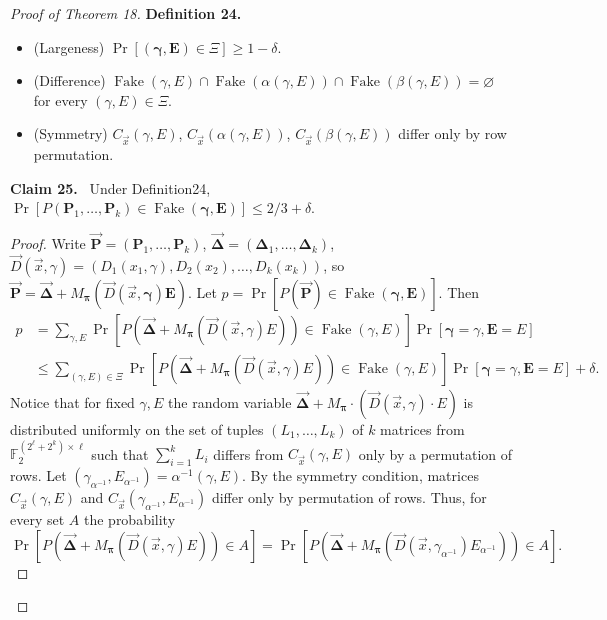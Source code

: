 \documentclass[10pt,a4paper]{article}
\newenvironment{authorclaim}[1]{\par\medskip\noindent\textbf{#1.}\ \ignorespaces}{\par\medskip}
\begin{document}
\begin{proof}[Proof of Theorem 18]
\begin{authorclaim}{Definition 24}
\begin{itemize}
\item (Largeness) $\Pr[(\boldsymbol\gamma,\mathbf E)\in\Xi]\ge1-\delta$.
\item (Difference) $\operatorname{Fake}(\gamma,E)\cap\operatorname{Fake}(\alpha(\gamma,E))\cap\operatorname{Fake}(\beta(\gamma,E))=\varnothing$ for every $(\gamma,E)\in\Xi$.
\item (Symmetry) $C_{\vec x}(\gamma,E)$, $C_{\vec x}(\alpha(\gamma,E))$, $C_{\vec x}(\beta(\gamma,E))$ differ only by row permutation.
\end{itemize}
\end{authorclaim}
\begin{authorclaim}{Claim 25}
Under Definition24, $\Pr[P(\mathbf P_1,\ldots,\mathbf P_k)\in\operatorname{Fake}(\boldsymbol\gamma,\mathbf E)]\le2/3+\delta$.
\end{authorclaim}
\begin{proof}
Write $\boldsymbol{\vec P}=(\mathbf P_1,\ldots,\mathbf P_k)$, $\boldsymbol{\vec\Delta}=(\boldsymbol\Delta_1,\ldots,\boldsymbol\Delta_k)$, $\vec D(\vec x,\gamma)=(D_1(x_1,\gamma),D_2(x_2),\ldots,D_k(x_k))$, so $\boldsymbol{\vec P}=\boldsymbol{\vec\Delta}+M_{\boldsymbol\pi}(\vec D(\vec x,\boldsymbol\gamma)\mathbf E)$.
Let $p=\Pr[P(\boldsymbol{\vec P})\in\operatorname{Fake}(\boldsymbol\gamma,\mathbf E)]$. Then
\begin{align*}
p&=\sum_{\gamma,E}\Pr[P(\boldsymbol{\vec\Delta}+M_{\boldsymbol\pi}(\vec D(\vec x,\gamma)E))\in\operatorname{Fake}(\gamma,E)]\Pr[\boldsymbol\gamma=\gamma,\mathbf E=E]\\
&\le\sum_{(\gamma,E)\in\Xi}\Pr[P(\boldsymbol{\vec\Delta}+M_{\boldsymbol\pi}(\vec D(\vec x,\gamma)E))\in\operatorname{Fake}(\gamma,E)]\Pr[\boldsymbol\gamma=\gamma,\mathbf E=E]+\delta .
\end{align*}
Notice that for fixed $\gamma,E$ the random variable $\boldsymbol{\vec\Delta}+M_{\boldsymbol\pi}\cdot(\vec D(\vec x,\gamma)\cdot E)$ is distributed uniformly on the set of tuples $(L_1,\ldots,L_k)$ of $k$ matrices from $\mathbb F_2^{(2^\ell+2^k)\times\ell}$ such that $\sum_{i=1}^kL_i$ differs from $C_{\vec x}(\gamma,E)$ only by a permutation of rows. Let $(\gamma_{\alpha^{-1}},E_{\alpha^{-1}})=\alpha^{-1}(\gamma,E)$. By the symmetry condition, matrices $C_{\vec x}(\gamma,E)$ and $C_{\vec x}(\gamma_{\alpha^{-1}},E_{\alpha^{-1}})$ differ only by permutation of rows. Thus, for every set $A$ the probability
\[
\Pr[P(\boldsymbol{\vec\Delta}+M_{\boldsymbol\pi}(\vec D(\vec x,\gamma)E))\in A]
=\Pr[P(\boldsymbol{\vec\Delta}+M_{\boldsymbol\pi}(\vec D(\vec x,\gamma_{\alpha^{-1}})E_{\alpha^{-1}}))\in A].
\]
\end{proof}
\end{proof}
\end{document}
